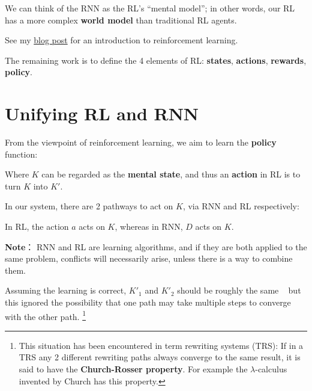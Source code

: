 \documentclass[12pt]{article}
\begin{document}
We can think of the RNN as the RL's ``mental model'';  in other words, our RL has a more complex \textbf{world model} than traditional RL agents.

See my \href{http://geniferology.blogspot.hk/2015/05/what-is-reinforcement-learning.html}{blog post} for an introduction to reinforcement learning.

The remaining work is to define the 4 elements of RL: \textbf{states}, \textbf{actions}, \textbf{rewards}, \textbf{policy}.

\section{Unifying RL and RNN}

From the viewpoint of reinforcement learning, we aim to learn the \textbf{policy} function: \par
\begin{figure}[H]
\centering
{}
\end{figure}
Where $K$ can be regarded as the \textbf{mental state}, and thus an \textbf{action} in RL is to turn $K$ into $K'$.

In our system, there are 2 pathways to act on $K$, via RNN and RL respectively: \par
\begin{figure}[H]
\centering
{}
\end{figure}
In RL, the action $a$ acts on $K$, whereas in RNN, $D$ acts on $K$.

\textbf{Note}： RNN and RL are learning algorithms, and if they are both applied to the same problem, conflicts will necessarily arise, unless there is a way to combine them.

Assuming the learning is correct, $K'_1$ and $K'_2$ should be roughly the same \textemdash~ but this ignored the possibility that one path may take multiple steps to converge with the other path.  \footnote{This situation has been encountered in term rewriting systems (TRS):  If in a TRS any 2 different rewriting paths always converge to the same result, it is said to have the \textbf{Church-Rosser property}.  For example the $\lambda$-calculus invented by Church has this property.} 
\end{document}

